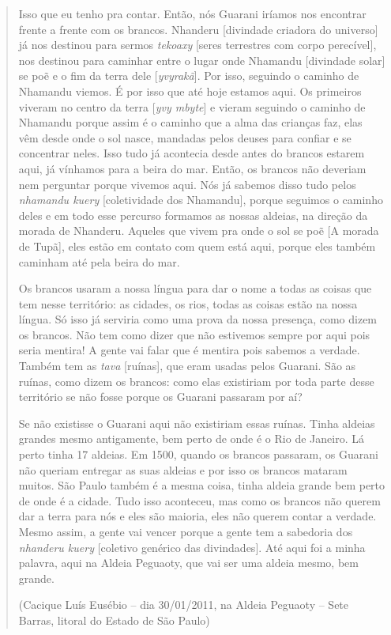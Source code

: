\begin{quote}
Isso que eu tenho pra contar. Então, nós Guarani iríamos nos encontrar
frente a frente com os brancos. Nhanderu {[}divindade criadora do
universo{]} já nos destinou para sermos \emph{tekoaxy} {[}seres
terrestres com corpo perecível{]}, nos destinou para caminhar entre o
lugar onde Nhamandu {[}divindade solar{]} se poẽ e o fim da terra dele
{[}\emph{yvyrakã}{]}. Por isso, seguindo o caminho de Nhamandu viemos. É
por isso que até hoje estamos aqui. Os primeiros viveram no centro da
terra {[}\emph{yvy mbyte}{]} e vieram seguindo o caminho de Nhamandu
porque assim é o caminho que a alma das crianças faz, elas vêm desde
onde o sol nasce, mandadas pelos deuses para confiar e se concentrar
neles. Isso tudo já acontecia desde antes do brancos estarem aqui, já
vínhamos para a beira do mar. Então, os brancos não deveriam nem
perguntar porque vivemos aqui. Nós já sabemos disso tudo pelos
\emph{nhamandu kuery} {[}coletividade dos Nhamandu{]}, porque seguimos o
caminho deles e em todo esse percurso formamos as nossas aldeias, na
direção da morada de Nhanderu. Aqueles que vivem pra onde o sol se poẽ
{[}A morada de Tupã{]}, eles estão em contato com quem está aqui, porque
eles também caminham até pela beira do mar.

Os brancos usaram a nossa língua para dar o nome a todas as coisas que
tem nesse território: as cidades, os rios, todas as coisas estão na
nossa língua. Só isso já serviria como uma prova da nossa presença, como
dizem os brancos. Não tem como dizer que não estivemos sempre por aqui
pois seria mentira! A gente vai falar que é mentira pois sabemos a
verdade. Também tem as \emph{tava} {[}ruínas{]}, que eram usadas pelos
Guarani. São as ruínas, como dizem os brancos: como elas existiriam por
toda parte desse território se não fosse porque os Guarani passaram por
aí?

Se não existisse o Guarani aqui não existiriam essas ruínas. Tinha
aldeias grandes mesmo antigamente, bem perto de onde é o Rio de Janeiro.
Lá perto tinha 17 aldeias. Em 1500, quando os brancos passaram, os
Guarani não queriam entregar as suas aldeias e por isso os brancos
mataram muitos. São Paulo também é a mesma coisa, tinha aldeia grande
bem perto de onde é a cidade. Tudo isso aconteceu, mas como os brancos
não querem dar a terra para nós e eles são maioria, eles não querem
contar a verdade. Mesmo assim, a gente vai vencer porque a gente tem a
sabedoria dos \emph{nhanderu kuery} {[}coletivo genérico das
divindades{]}. Até aqui foi a minha palavra, aqui na Aldeia Peguaoty,
que vai ser uma aldeia mesmo, bem grande.

(Cacique Luís Eusébio -- dia 30/01/2011, na Aldeia Peguaoty -- Sete
Barras, litoral do Estado de São Paulo)
\end{quote}

